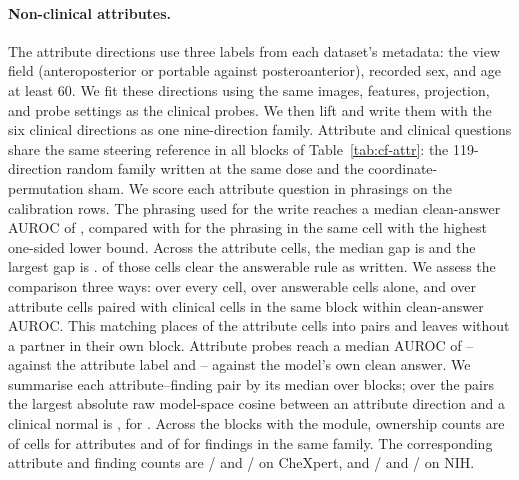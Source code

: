 \documentclass{article}
\begin{document}
\paragraph{Non-clinical attributes.} The attribute directions use three labels from each dataset's metadata: the view field (anteroposterior or portable against posteroanterior), recorded sex, and age at least 60. We fit these directions using the same images, features, projection, and probe settings as the clinical probes. We then lift and write them with the six clinical directions as one nine-direction family. Attribute and clinical questions share the same steering reference in all \cfAttrRefBlocks{} blocks of Table~\ref{tab:cf-attr}: the 119-direction random family written at the same dose and the coordinate-permutation sham. We score each attribute question in \cfAttrqPhrasings{} phrasings on the calibration rows. The phrasing used for the write reaches a median clean-answer AUROC of \cfAttrqWrittenAuroc{}, compared with \cfAttrqSelectedAuroc{} for the phrasing in the same cell with the highest one-sided lower bound. Across the \cfAttrqCells{} attribute cells, the median gap is \cfAttrqGain{} and the largest gap is \cfAttrqGainMax{}. \cfAttrqCapable{} of those cells clear the answerable rule as written. We assess the comparison three ways: over every cell, over answerable cells alone, and over attribute cells paired with clinical cells in the same block within \cfAttrPairWindow{} clean-answer AUROC. This matching places \cfAttrPairMatched{} of the \cfAttrPairCellsN{} attribute cells into \cfAttrPairAttrN{} pairs and leaves \cfAttrPairUnmatched{} without a partner in their own block. Attribute probes reach a median AUROC of \cfAttrAurocMin{}--\cfAttrAurocMax{} against the attribute label and \cfAttrAnswerAurocMin{}--\cfAttrAnswerAurocMax{} against the model's own clean answer. We summarise each attribute--finding pair by its median over blocks; over the \cfAttrCosPairs{} pairs the largest absolute raw model-space cosine between an attribute direction and a clinical normal is \cfAttrCosMax{}, for \cfAttrCosPairLabel{}. Across the \cfAttrBlocks{} blocks with the module, ownership counts are \cfAttrChestAttrOwned{} of \cfAttrChestAttrN{} cells for attributes and \cfAttrChestClinOwned{} of \cfAttrChestClinN{} for findings in the same family. The corresponding attribute and finding counts are \cfAttrChexAttrOwned{}/\cfAttrChexAttrN{} and \cfAttrChexClinOwned{}/\cfAttrChexClinN{} on CheXpert, and \cfAttrNihAttrOwned{}/\cfAttrNihAttrN{} and \cfAttrNihClinOwned{}/\cfAttrNihClinN{} on NIH.
\end{document}
